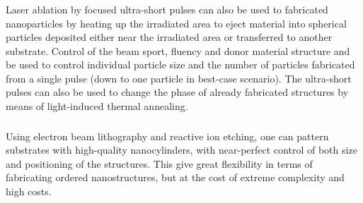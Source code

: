         \subsubsection{}
                Laser ablation by focused ultra-short pulses can also be used to fabricated nanoparticles by heating up the irradiated area to eject material into
            spherical particles deposited either near the irradiated area or transferred to another substrate. Control of the beam sport, fluency and donor material
            structure and be used to control individual particle size and the number of particles fabricated from a single pulse (down to one particle in best-case
            scenario). The ultra-short pulses can also be used to change the phase of already fabricated structures by means of light-induced thermal annealing.
        \subsubsection{}
                Using electron beam lithography and reactive ion etching, one can pattern substrates with high-quality nanocylinders, with near-perfect
            control of both size and positioning of the structures. This give great flexibility in terms of fabricating ordered nanostructures, but at the
            cost of extreme complexity and high costs.

\clearpage
